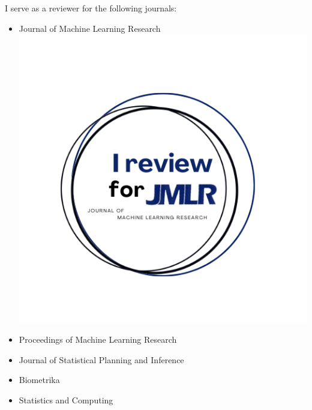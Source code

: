 
\begin{cvpubs}
\end{cvpubs}

\begin{small} \color{black}

I serve as a reviewer for the following journals:
\vspace{-0.25cm}
\begin{itemize}
    \item Journal of Machine Learning Research \includegraphics[width=.25in]{cv/figure/JMLR.png}
    \item Proceedings of Machine Learning Research
    \item Journal of Statistical Planning and Inference
    \item Biometrika
    \item Statistics and Computing
\end{itemize}
\end{small}


